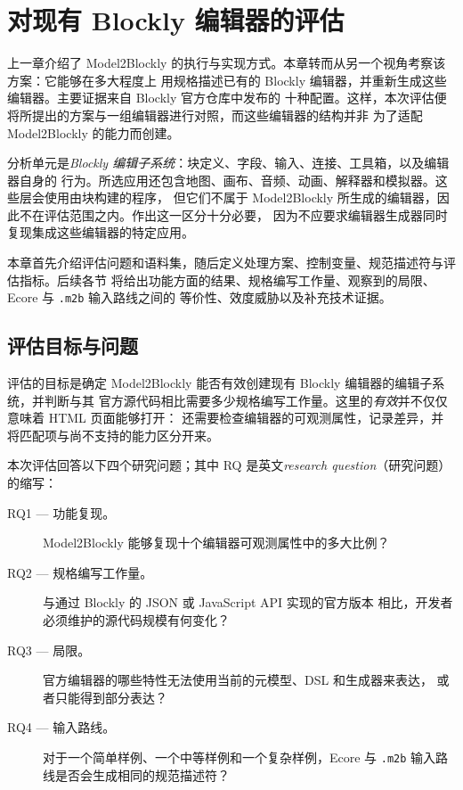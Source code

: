 \chapter{对现有 Blockly 编辑器的评估}
\label{chap:evaluacion}
\label{chap:casos-evaluacion}

上一章介绍了 Model2Blockly 的执行与实现方式。本章转而从另一个视角考察该方案：它能够在多大程度上
用规格描述已有的 Blockly 编辑器，并重新生成这些编辑器。主要证据来自 Blockly 官方仓库中发布的
十种配置。这样，本次评估便将所提出的方案与一组编辑器进行对照，而这些编辑器的结构并非
为了适配 Model2Blockly 的能力而创建。

分析单元是\emph{Blockly 编辑子系统}：块定义、字段、输入、连接、工具箱，以及编辑器自身的
行为。所选应用还包含地图、画布、音频、动画、解释器和模拟器。这些层会使用由块构建的程序，
但它们不属于 Model2Blockly 所生成的编辑器，因此不在评估范围之内。作出这一区分十分必要，
因为不应要求编辑器生成器同时复现集成这些编辑器的特定应用。

本章首先介绍评估问题和语料集，随后定义处理方案、控制变量、规范描述符与评估指标。后续各节
将给出功能方面的结果、规格编写工作量、观察到的局限、Ecore 与 \texttt{.m2b} 输入路线之间的
等价性、效度威胁以及补充技术证据。

\section{评估目标与问题}
\label{sec:objetivo-evaluacion}

评估的目标是确定 Model2Blockly 能否有效创建现有 Blockly 编辑器的编辑子系统，并判断与其
官方源代码相比需要多少规格编写工作量。这里的\emph{有效}并不仅仅意味着 HTML 页面能够打开：
还需要检查编辑器的可观测属性，记录差异，并将匹配项与尚不支持的能力区分开来。

本次评估回答以下四个研究问题；其中 RQ 是英文\emph{research question}（研究问题）的缩写：

\begin{description}
  \item[RQ1 --- 功能复现。] Model2Blockly 能够复现十个编辑器可观测属性中的多大比例？

  \item[RQ2 --- 规格编写工作量。] 与通过 Blockly 的 JSON 或 JavaScript API 实现的官方版本
  相比，开发者必须维护的源代码规模有何变化？

  \item[RQ3 --- 局限。] 官方编辑器的哪些特性无法使用当前的元模型、DSL 和生成器来表达，
  或者只能得到部分表达？

  \item[RQ4 --- 输入路线。] 对于一个简单样例、一个中等样例和一个复杂样例，Ecore 与
  \texttt{.m2b} 输入路线是否会生成相同的规范描述符？
\end{description}

